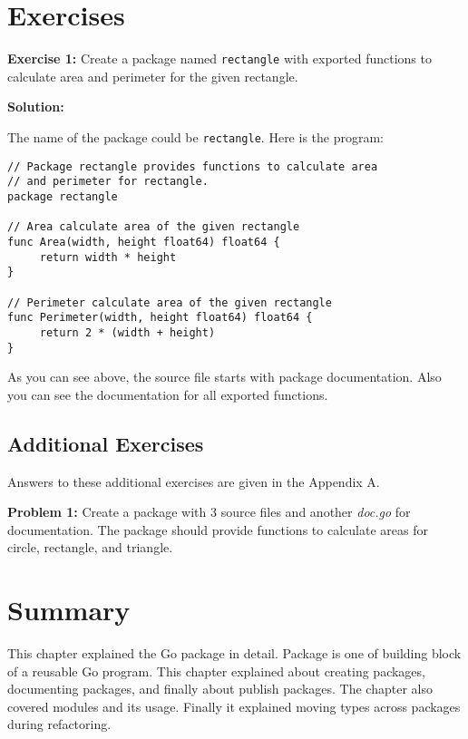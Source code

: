\section{Exercises}

{\bf Exercise 1:} Create a package named \texttt{rectangle} with
exported functions to calculate area and perimeter for the given
rectangle.

\textbf{Solution:}

The name of the package could be \texttt{rectangle}.  Here is the
program:

\begin{lstlisting}[numbers=none]
// Package rectangle provides functions to calculate area
// and perimeter for rectangle.
package rectangle

// Area calculate area of the given rectangle
func Area(width, height float64) float64 {
     return width * height
}

// Perimeter calculate area of the given rectangle
func Perimeter(width, height float64) float64 {
     return 2 * (width + height)
}
\end{lstlisting}

As you can see above, the source file starts with package
documentation.  Also you can see the documentation for all exported
functions.

\subsection{Additional Exercises}

Answers to these additional exercises are given in the Appendix A.

{\bf Problem 1:} Create a package with 3 source files and
another \textit{doc.go} for documentation.  The package should provide
functions to calculate areas for circle, rectangle, and triangle.

\section*{Summary}

This chapter explained the Go package in detail.  Package is one of
building block of a reusable Go program.  This chapter explained about
creating packages, documenting packages, and finally about publish
packages.  The chapter also covered modules and its usage.  Finally it
explained moving types across packages during refactoring.
